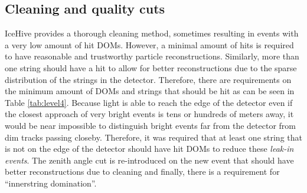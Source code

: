\begin{table}[]
\caption{Overview of quality cuts in Level 4.}
\label{tab:level4}
\end{table}

\subsection{Cleaning and quality cuts}
\noindent IceHive provides a thorough cleaning method, sometimes resulting in events with a very low amount of hit DOMs. However, a minimal amount of hits is required to have reasonable and trustworthy particle reconstructions. Similarly, more than one string should have a hit to allow for better reconstructions due to the sparse distribution of the strings in the detector. Therefore, there are requirements on the minimum amount of DOMs and strings that should be hit as can be seen in Table \ref{tab:level4}. Because light is able to reach the edge of the detector even if the closest approach of very bright events is tens or hundreds of meters away, it would be near impossible to distinguish bright events far from the detector from dim tracks passing closeby. Therefore, it was required that at least one string that is not on the edge of the detector should have hit DOMs to reduce these \textit{leak-in events}.
The zenith angle cut is re-introduced on the new event that should have better reconstructions due to cleaning and finally, there is a requirement for ``innerstring domination''.


